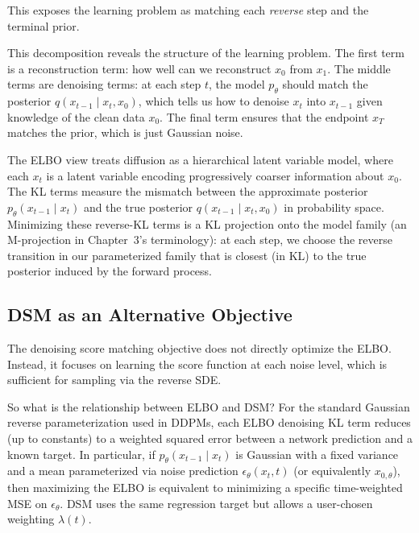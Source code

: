 This exposes the learning problem as matching each \emph{reverse} step and the terminal prior.


\vspPara

This decomposition reveals the structure of the learning problem. The first term is a reconstruction term: how well can we reconstruct $x_0$ from $x_1$. The middle terms are denoising terms: at each step $t$, the model $p_\theta$ should match the posterior $q(x_{t-1} \mid x_t, x_0)$, which tells us how to denoise $x_t$ into $x_{t-1}$ given knowledge of the clean data $x_0$. The final term ensures that the endpoint $x_T$ matches the prior, which is just Gaussian noise.

\vspSection

\begin{geometrylens}
The ELBO view treats diffusion as a hierarchical latent variable model, where each $x_t$ is a latent variable encoding progressively coarser information about $x_0$. The KL terms measure the mismatch between the approximate posterior $p_\theta(x_{t-1} \mid x_t)$ and the true posterior $q(x_{t-1} \mid x_t, x_0)$ in probability space. Minimizing these reverse-KL terms is a KL projection onto the model family (an M-projection in Chapter~3's terminology): at each step, we choose the reverse transition in our parameterized family that is closest (in KL) to the true posterior induced by the forward process.
\end{geometrylens}

\vspSection

\subsection{DSM as an Alternative Objective}

The denoising score matching objective does not directly optimize the ELBO. Instead, it focuses on learning the score function at each noise level, which is sufficient for sampling via the reverse SDE.

\vspPara

So what is the relationship between ELBO and DSM? For the standard Gaussian reverse parameterization used in DDPMs, each ELBO denoising KL term reduces (up to constants) to a weighted squared error between a network prediction and a known target. In particular, if $p_\theta(x_{t-1}\mid x_t)$ is Gaussian with a fixed variance and a mean parameterized via noise prediction $\epsilon_\theta(x_t,t)$ (or equivalently $x_{0,\theta}$), then maximizing the ELBO is equivalent to minimizing a specific time-weighted MSE on $\epsilon_\theta$. DSM uses the same regression target but allows a user-chosen weighting $\lambda(t)$.


